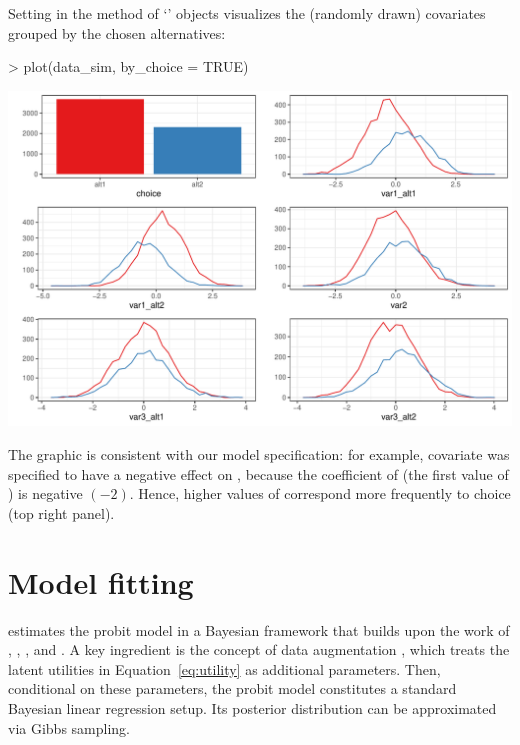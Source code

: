 \documentclass[article,shortnames]{jss}
\newcommand{\class}[1]{`\code{#1}'}
\newcommand{\fct}[1]{\code{#1()}}
\begin{document}
Setting  in the \fct{plot} method of \class{RprobitB\_data} objects visualizes the (randomly drawn) covariates grouped by the chosen alternatives:

\begin{Schunk}
\begin{Sinput}
> plot(data_sim, by_choice = TRUE)
\end{Sinput}
\end{Schunk}
\includegraphics{rprobitb_oelschlaeger_bauer-sim-data}

The graphic is consistent with our model specification: for example, covariate  was specified to have a negative effect on , because the coefficient of  (the first value of ) is negative $(-2)$. Hence, higher values of  correspond more frequently to choice  (top right panel).

\section{Model fitting} \label{sec:model_fitting}

 estimates the probit model in a Bayesian framework that builds upon the work of \cite{McCulloch:1994}, \cite{Nobile:1998}, \cite{Allenby:1998}, and \cite{Imai:2005}. A key ingredient is the concept of data augmentation \citep{Albert:1993}, which treats the latent utilities in Equation~\ref{eq:utility} as additional parameters. Then, conditional on these parameters, the probit model constitutes a standard Bayesian linear regression setup. Its posterior distribution can be approximated via Gibbs sampling.
\end{document}
